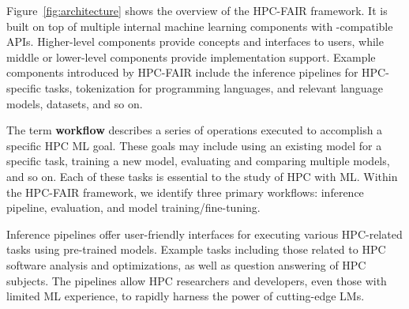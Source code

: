 

Figure~\ref{fig:architecture} shows the overview of the HPC-FAIR framework. It is built on top of multiple internal machine learning components with \face-compatible APIs. Higher-level components provide concepts and interfaces to users, while middle or lower-level components provide implementation support. 
Example components introduced by HPC-FAIR include the inference pipelines for HPC-specific tasks, tokenization for programming languages, and relevant language models, datasets, and so on. %

The term \textbf{workflow} describes a series of operations executed to accomplish a specific HPC ML goal. These goals may include using an existing model for a specific task, training a new model, evaluating and comparing multiple models, and so on. Each of these tasks is essential to the study of HPC with ML. Within the HPC-FAIR framework, we identify three primary workflows: inference pipeline, evaluation, and model training/fine-tuning.

Inference pipelines offer user-friendly interfaces for executing various HPC-related  tasks using pre-trained models. Example tasks including those related to HPC software analysis and optimizations, as well as question answering of HPC subjects. The pipelines allow HPC researchers and developers, even those with limited ML experience, to rapidly harness the power of cutting-edge LMs. 

